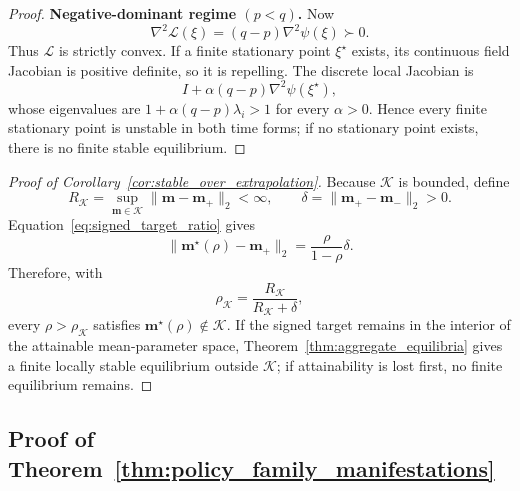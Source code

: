 \documentclass{article}
\theoremstyle{plain}
\theoremstyle{definition}
\theoremstyle{remark}
\begin{document}
\begin{proof}
\medskip
\noindent\textbf{Negative-dominant regime \((p<q)\).}
Now
\[
\nabla^2\mathcal L(\xi)
=
(q-p)\nabla^2\psi(\xi)
\succ0.
\]
Thus \(\mathcal L\) is strictly convex. If a finite stationary point
\(\xi^\star\) exists, its continuous field Jacobian is positive
definite, so it is repelling. The discrete local Jacobian is
\[
I+\alpha(q-p)\nabla^2\psi(\xi^\star),
\]
whose eigenvalues are
\(1+\alpha(q-p)\lambda_i>1\) for every \(\alpha>0\).
Hence every finite stationary point is unstable in both time forms; if
no stationary point exists, there is no finite stable equilibrium.
\end{proof}

\begin{proof}[Proof of Corollary~\ref{cor:stable_over_extrapolation}]
Because \(\mathcal K\) is bounded, define
\[
R_{\mathcal K}
=
\sup_{\mathbf m\in\mathcal K}
\|\mathbf m-\mathbf m_+\|_2
<\infty,
\qquad
\delta
=
\|\mathbf m_+-\mathbf m_-\|_2
>0.
\]
Equation~\eqref{eq:signed_target_ratio} gives
\[
\|\mathbf m^\star(\rho)-\mathbf m_+\|_2
=
\frac{\rho}{1-\rho}\delta.
\]
Therefore, with
\[
\rho_{\mathcal K}
=
\frac{R_{\mathcal K}}{R_{\mathcal K}+\delta},
\]
every \(\rho>\rho_{\mathcal K}\) satisfies
\(\mathbf m^\star(\rho)\notin\mathcal K\).
If the signed target remains in the interior of the attainable
mean-parameter space, Theorem~\ref{thm:aggregate_equilibria}
gives a finite locally stable equilibrium outside \(\mathcal K\); if
attainability is lost first, no finite equilibrium remains.
\end{proof}

\subsection{Proof of
Theorem~\ref{thm:policy_family_manifestations}}
\label{app:policy_family_manifestations}
\end{document}
